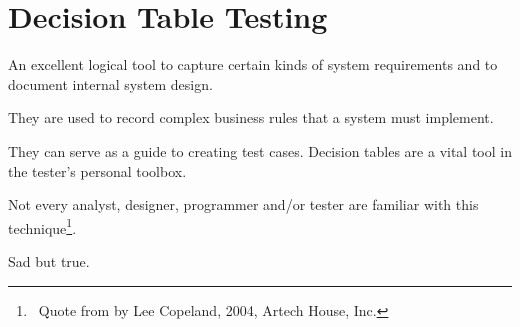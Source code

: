 \section{Decision Table Testing}
\label{sec:Decision Table Testing}

An excellent logical tool to capture certain kinds of system requirements and to document internal system design. 

They are used to record complex business rules that a system must implement. 

They can serve as a guide to creating test cases. Decision tables are a vital tool in the tester's personal toolbox.

Not every analyst, designer, programmer and/or tester are familiar with this technique\footnote{~Quote from  by Lee Copeland, 2004, Artech House, Inc.}.

Sad but true.
